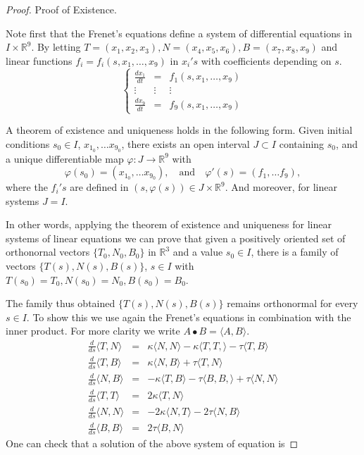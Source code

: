 \documentclass{amsart}
\begin{document}
\begin{proof}
Proof of Existence.

Note first that the Frenet's equations define a system of differential equations in \(I\times \mathbb{R}^9\). By letting \(T = (x_1,x_2,x_3),N = (x_4,x_5,x_6),B = (x_7,x_8,x_9)\) and linear functions \(f_i = f_i(s,x_1,\ldots, x_9)\) in \(x_i's\) with coefficients depending on \(s\).
\[
\left\{ \begin{array}{ccc}
\frac{dx_1}{dt} & = & f_1(s,x_1,\ldots,x_9)\\
\vdots & \vdots & \vdots  \\
\frac{dx_9}{dt} & = & f_9(s,x_1,\ldots,x_9)
\end{array} \right. \]

A theorem of existence and uniqueness holds in the following form. Given initial conditions \(s_0\in I\), \(x_{1_0}, \ldots x_{9_0}\), there exists an open interval \(J\subset I\) containing \(s_0\), and a unique differentiable map \(\varphi : J \to \mathbb{R}^9\) with
\[ \varphi(s_0) = (x_{1_0}, \ldots x_{9_0}), \quad \mbox{and} \quad \varphi'(s) = (f_1,\ldots f_9), \]
where the \(f_i's\) are defined in \((s,\varphi(s)) \in J \times \mathbb{R}^9\). And moreover, for linear systems \(J = I\).

In other words, applying the theorem of existence and uniqueness for linear systems of linear equations we can prove that given a positively oriented set of orthonornal vectors \(\{T_0,N_0,B_0\}\) in \(\mathbb{R}^3\)
and a value \(s_0\in I\), there is a family of vectors \(\{ T(s) , N(s), B(s) \}\), \(s\in I\) with \(T(s_0) = T_0, N(s_0) = N_0, B(s_0) = B_0\).

The family thus obtained \(\{T(s), N(s), B(s) \}\) remains orthonormal for every \(s\in I\). To show this we use again the Frenet's equations in combination with the inner product. For more clarity we write \(A\bullet B = \langle A, B \rangle\).
\begin{equation}
\begin{array}{rcl}
\frac{d}{ds}\langle T,N\rangle & = & \kappa \langle N, N \rangle - \kappa \langle T, T, \rangle - \tau \langle T, B\rangle\\
\frac{d}{ds}\langle T,B\rangle & = & \kappa \langle N, B \rangle + \tau \langle T, N\rangle\\
\frac{d}{ds}\langle N,B\rangle & = & -\kappa \langle T, B \rangle - \tau \langle B, B, \rangle + \tau \langle N, N\rangle\\
\frac{d}{ds}\langle T,T\rangle & = & 2\kappa \langle T, N \rangle \\
\frac{d}{ds}\langle N,N\rangle & = & -2\kappa \langle N, T \rangle  - 2 \tau \langle N, B\rangle\\
\frac{d}{ds}\langle B,B\rangle & = & 2 \tau \langle B, N\rangle
\end{array}
\end{equation}
One can check that a solution of the above system of equation is


\end{proof}
\end{document}
